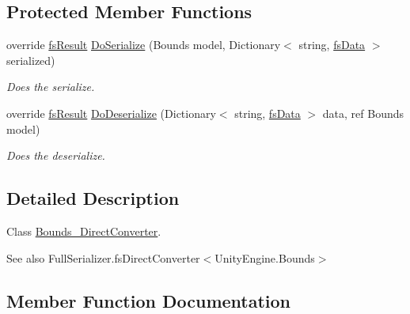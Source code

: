 \subsection*{Protected Member Functions}
\begin{DoxyCompactItemize}
\item 
override \hyperlink{struct_full_serializer_1_1fs_result}{fs\+Result} \hyperlink{class_full_serializer_1_1_internal_1_1_direct_converters_1_1_bounds___direct_converter_acdba107944e59d9620b06e224c51baf0}{Do\+Serialize} (Bounds model, Dictionary$<$ string, \hyperlink{class_full_serializer_1_1fs_data}{fs\+Data} $>$ serialized)
\begin{DoxyCompactList}\small\item\em Does the serialize. \end{DoxyCompactList}\item 
override \hyperlink{struct_full_serializer_1_1fs_result}{fs\+Result} \hyperlink{class_full_serializer_1_1_internal_1_1_direct_converters_1_1_bounds___direct_converter_a2d4d2290cff048bd14274876f4814afe}{Do\+Deserialize} (Dictionary$<$ string, \hyperlink{class_full_serializer_1_1fs_data}{fs\+Data} $>$ data, ref Bounds model)
\begin{DoxyCompactList}\small\item\em Does the deserialize. \end{DoxyCompactList}\end{DoxyCompactItemize}


\subsection{Detailed Description}
Class \hyperlink{class_full_serializer_1_1_internal_1_1_direct_converters_1_1_bounds___direct_converter}{Bounds\+\_\+\+Direct\+Converter}. 

\begin{DoxySeeAlso}{See also}
Full\+Serializer.\+fs\+Direct\+Converter$<$\+Unity\+Engine.\+Bounds$>$


\end{DoxySeeAlso}


\subsection{Member Function Documentation}
\mbox{\label{class_full_serializer_1_1_internal_1_1_direct_converters_1_1_bounds___direct_converter_a51f328e67770f34468f7218b4a4a2af6}} 
